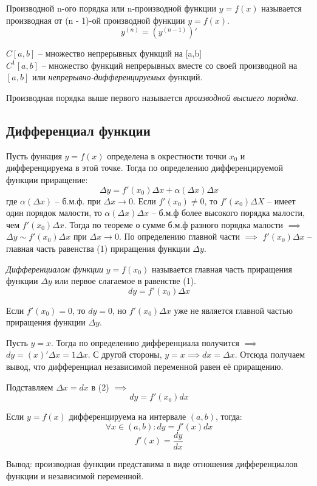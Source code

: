 \begin{definition}
  Производной n-ого порядка или n-производной функции $y = f(x)$ называется производная от (n - 1)-ой производной функции $y=f(x)$. \[
    y^{(n)} = \left( y^{(n-1)} \right)'
  \] 
\end{definition}

$C[a, b]$ -- множество непрерывных функций на [a,b] \\
$C^1[a, b]$ -- множество функций непрерывных вместе со своей производной на $[a,b]$ или  \textit{непрерывно-дифференцируемых} функций. 

\begin{definition}
  Производная порядка выше первого называется \textit{производной высшего порядка}.
\end{definition}

\subsection{Дифференциал функции}

Пусть функция $y = f(x)$ определена в окрестности точки $x_0$ и дифференцируема в этой точке. Тогда по определению дифференцируемой функции приращение: \[
  \Delta y = f'(x_0) \Delta x + \alpha(\Delta x) \Delta x \tag{1}
\] 
где $\alpha(\Delta x)$ -- б.м.ф. при $\Delta x \to 0$.
Если $f'(x_0) \neq 0$, то $f'(x_0) \Delta X$ -- имеет один порядок малости, то $\alpha(\Delta x) \Delta x$ -- б.м.ф более высокого порядка малости, чем $f'(x_0) \Delta x$. 
Тогда по теореме о сумме б.м.ф разного порядка малости $\implies$ $\Delta  y \sim f'(x_0) \Delta x$ при $\Delta x \to 0$.
По определению главной части $\implies$ $f'(x_0) \Delta x$ -- главная часть равенства (1) приращения функции $\Delta y$.

\begin{definition}
  \textit{Дифференциалом функции} $y = f(x_0)$ называется главная часть приращения функции $\Delta y$ или первое слагаемое в равенстве (1). \[
    dy = f'(x_0) \Delta x \tag{2}
  \] 
\end{definition}

Если $f'(x_0) = 0$, то $dy = 0$, но  $f'(x_0) \Delta x$ уже не является главной частью приращения функции $\Delta y$.

Пусть $y = x$. Тогда по определению дифференциала получится $\implies$ $dy = (x)' \Delta x = 1 \Delta x$. С другой стороны, $y = x \implies dx = \Delta x$. Отсюда получаем вывод, что дифференциал независимой переменной равен её приращению.

Подставляем $\Delta x = dx$ в (2) $\implies$ \[
  \boxed{dy = f'(x_0) dx} \tag{3}
\] 

Если $y = f(x)$ дифференцируема на интервале  $(a, b)$, тогда:  \[
  \forall x \in (a, b): \boxed{dy = f'(x) dx} \tag{4}
\] 
\[
  \boxed{f'(x) = \frac{dy}{dx}} \tag{5}
\]

Вывод: производная функции представима в виде отношения дифференциалов функции и независимой переменной.

